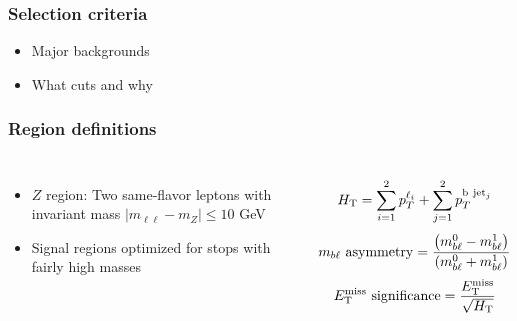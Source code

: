 \documentclass[10pt, svgnames]{beamer}
\begin{document}
\begin{frame}
  \frametitle{Selection criteria}
  \UpdateFlag
  \begin{itemize}
    \item Major backgrounds
    \item What cuts and why
  \end{itemize}
\end{frame}

\frame
{
  \frametitle{Region definitions}
  \begin{center}
  \end{center}

  \begin{columns}
    \begin{itemize}
      \item $Z$ region: Two same-flavor leptons
        with invariant mass $|m_{\ell\ell} - m_Z| \le 10$ GeV
      \item Signal regions optimized for stops with fairly high masses
    \end{itemize}
    \[
      H_{\mathrm{T}} = \sum_{i=1}^{2} p_T^{\ell_i} + \sum_{j=1}^{2} p_T^{\mathrm{b~jet}_j}
    \]
    \[
      m_{b\ell}~\mathrm{asymmetry} = 
      \frac{\left(m_{b\ell}^0-m_{b\ell}^1\right)}{\left(m_{b\ell}^0+m_{b\ell}^1\right)}
    \]
    \[
      E_{\mathrm{T}}^{\mathrm{miss}}~\text{significance} = \frac{E_{\mathrm{T}}^{\mathrm{miss}}}{\sqrt{H_{\mathrm{T}}}}
    \]
  \end{columns}
}
\end{document}
